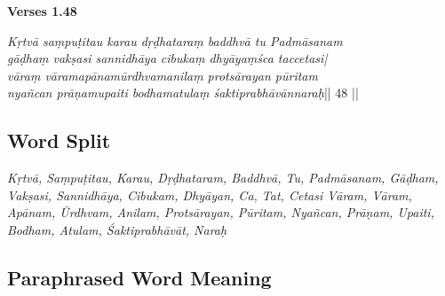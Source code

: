 \noindent \textbf{Verses 1.48}

\begin{shloka}
\textit{Kṛtvā saṃpuṭitau karau  dṛḍhataraṃ baddhvā tu Padmāsanam\\
gāḍhaṃ vakṣasi sannidhāya cibukaṃ dhyāyaṃśca taccetasi|\\
vāraṃ vāramapānamūrdhvamanilaṃ protsārayan pūritam\\
nyañcan prāṇamupaiti bodhamatulaṃ śaktiprabhāvānnaraḥ}|| 48 ||
\end{shloka}

\subsection*{Word Split}

\textit{Kṛtvā, Saṃpuṭitau, Karau,  Dṛḍhataram, Baddhvā, Tu, Padmāsanam, Gāḍham, Vakṣasi, Sannidhāya, Cibukam, Dhyāyan, Ca, Tat, Cetasi Vāram, Vāram,  Apānam, Ūrdhvam, Anilam, Protsārayan, Pūritam, Nyañcan, Prāṇam, Upaiti, Bodham, Atulam,  Śaktiprabhāvāt, Naraḥ}
\newpage
\subsection*{Paraphrased Word Meaning}

